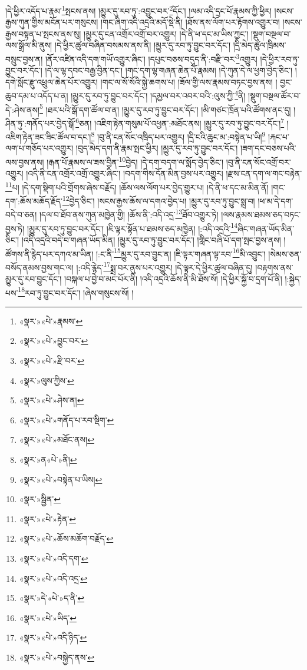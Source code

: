 །དེ་ཕྱིར་འདོད་པ་རྣམ་\footnote{«སྣར་»«པེ་»རྣམས་}སྤངས་ནས། །མྱུར་དུ་རབ་ཏུ་:འབྱུང་བར་\footnote{«སྣར་»«པེ་»བྱུང་བར་}དོང་། །ལམ་འདི་དྲང་པོ་རྣམས་ཀྱི་ཕྱིར། །སངས་རྒྱས་ཀུན་གྱིས་མངོན་པར་གསུངས། །གང་ཞིག་འདི་འདྲའི་མདོ་སྡེ་ནི། །ཐོས་ནས་ལོག་པར་རྟོགས་འགྱུར་བ། །སངས་རྒྱས་བསྟན་པ་སྤངས་ནས་སུ། །མྱུར་དུ་ངན་འགྲོར་འགྲོ་བར་འགྱུར། །དེ་ནི་ཕ་དང་མ་ཡིས་ཀྱང་། །སྡུག་བསྔལ་བ་ལས་སྒྲོལ་མི་ནུས། །དེ་ཕྱིར་ཚུལ་བཞིན་བསམས་ནས་ནི། །མྱུར་དུ་རབ་ཏུ་བྱུང་བར་དོང་། །དྲི་མེད་ཚུལ་ཁྲིམས་བསྲུང་བྱས་ན། །ནོར་འཛིན་འདི་དག་གཡོ་འགྱུར་ཞིང་། །དཔུང་བཅས་བདུད་ནི་:བརྫི་བར་\footnote{«སྣར་»«པེ་»རྫི་བར་}འགྱུར། །དེ་ཕྱིར་རབ་ཏུ་བྱུང་བར་དོང་། །དེ་ལ་ལྷ་དབང་བརྒྱ་བྱིན་དང་། །གང་དག་ལྷ་གཞན་ཆེན་པོ་རྣམས། །དེ་ཀུན་དེ་ལ་ཕྱག་བྱེད་ཅིང་། །དགེ་སློང་རྫུ་འཕྲུལ་ཆེན་པོར་འགྱུར། །གང་ལ་སོ་སོའི་སྐྱེ་ཆགས་པ། །ཟོལ་གྱི་ལས་རྣམས་བཏང་བྱས་ནས། །
བྱང་ཆུབ་དམ་པ་འདོད་པ་ན། །མྱུར་དུ་རབ་ཏུ་བྱུང་བར་དོང་། །དམྱལ་བར་འབར་བའི་:ལུས་ཀྱི་\footnote{«སྣར་»ལུས་ཀྱིས་}ནི། །སྡུག་བསྔལ་ཚོར་བ་དེ་:ཤེས་ནས།\footnote{«སྣར་»«པེ་»ཤེས་ན།} །ཐར་པའི་སྒོ་དག་ཚོལ་བ་ན། །མྱུར་དུ་རབ་ཏུ་བྱུང་བར་དོང་། །མི་གཙང་ཁྲོན་པའི་ཚོགས་ནང་དུ། །ཤིན་ཏུ་:གནོད་པར་བྱེད་སྒོ་\footnote{«སྣར་»«པེ་»གནོད་པ་རབ་སྡིག་}ཅན། །འཇིག་རྟེན་གསུམ་པོ་འཕྱན་:མཐོང་ནས། །མྱུར་དུ་རབ་ཏུ་བྱུང་བར་དོང་།\footnote{«སྣར་»«པེ་»མཐོང་ནས།} །འཇིག་རྟེན་ཟང་ཟིང་ཚོལ་བ་དང་།\footnote{«སྣར་»ན«པེ་»ནི།} །བུ་ནི་ངན་སོང་འཁྲིད་པར་འགྱུར། །དྲི་ངའི་ཆུང་མ་:བསྟེན་པ་ཡི།\footnote{«སྣར་»«པེ་»བསྟེན་པ་ཡིས།} །རྐང་པ་ལག་པ་གཅོད་པར་འགྱུར། །བུད་མེད་དག་ནི་རྣམ་སྤང་ཕྱིར། །མྱུར་དུ་རབ་ཏུ་བྱུང་བར་དོང་། །ཟག་དང་བཅས་པའི་ལས་བྱས་ནས། །རྒན་པོ་རྣམས་ལ་ཟས་བྱིན་\footnote{«སྣར་»སྦྱིན་}བྱེད། །དེ་དག་བདག་ལ་སྨོད་བྱེད་ཅིང་། །བུ་ནི་ངན་སོང་འགྲོ་བར་འགྱུར། །འདི་ནི་ངན་འགྲོར་འགྲོ་འགྱུར་ཞིང་། །བདག་གིས་དོན་མིན་བྱས་པར་འགྱུར། །རྫས་ངན་དག་ལ་གང་བརྟེན་\footnote{«སྣར་»«པེ་»རྟེན་}པ། །དེ་དག་སྡིག་པའི་གྲོགས་ཞེས་བརྗོད། །ཆོས་ལས་ལོག་པར་བྱེད་གྱུར་པ། །དེ་ནི་ཕ་དང་མ་མིན་ནོ། །གང་དག་:ཆོས་མཆོད་རྗོད་\footnote{«སྣར་»«པེ་»ཆོས་མཆོག་བརྗོད་}བྱེད་ཅིང་། །སངས་རྒྱས་ཆོས་ལ་དགའ་བྱེད་པ། །མྱུར་དུ་རབ་ཏུ་བྱུང་སྨྲ་བ། །ཕ་མ་དེ་དག་བདེ་བ་ཅན། །དལ་བ་ཐོབ་ནས་ཀུན་མཁྱེན་གྱི། །ཆོས་ནི་:འདི་འདྲ་\footnote{«སྣར་»«པེ་»འདི་དག་}ཐོབ་འགྱུར་ཏེ། །ལས་རྣམས་ཐམས་ཅད་བཏང་བྱས་ཏེ། །མྱུར་དུ་རབ་ཏུ་བྱུང་བར་དོང་། །ཇི་ལྟར་སྟོན་པ་ཐམས་ཅད་མཁྱེན། །:འདི་འདྲའི་\footnote{«སྣར་»«པེ་»འདི་འདྲ་}ཞིང་གཞན་ཡོད་མིན་ཅིང་། །འདི་འདྲའི་བདེ་བ་གཞན་ཡོད་མིན། །མྱུར་དུ་རབ་ཏུ་བྱུང་བར་དོང་། །གླིང་བཞི་པོ་དག་སྤང་བྱས་ནས། །ཚོགས་ནི་རྙེད་པར་དཀའ་མ་ཡིན། །:ང་ནི་\footnote{«སྣར་»དེ་«པེ་»ད་ནི་}མྱུར་དུ་རབ་བྱུང་ན། །ཇི་ལྟར་གཞན་ལྟ་རབ་\footnote{«སྣར་»«པེ་»ཡིད་}མི་འབྱུང་། །སེམས་ཅན་བསོད་ནམས་བྱས་གང་ལ། །:འདི་རྙེད་\footnote{«སྣར་»«པེ་»འདི་ཉིད་}སྨྲ་བར་ནུས་པར་འགྱུར། །དེ་ལྟར་དེ་ཕྱིར་ཚུལ་བཞིན་དུ། །བརྟགས་ནས་མྱུར་དུ་རབ་བྱུང་དོང་། །བསྐལ་པ་བྱེ་བ་མང་པོར་ནི། །འདི་འདྲའི་ཆོས་ནི་མི་ཐོས་སོ། །དེ་ཕྱིར་སྐྱོ་བ་དྲག་པོ་ནི། །:སྐྱེད་པས་\footnote{«སྣར་»«པེ་»བསྐྱེད་ནས་}རབ་ཏུ་བྱུང་བར་དོང་། །ཞེས་གསུངས་སོ། །
